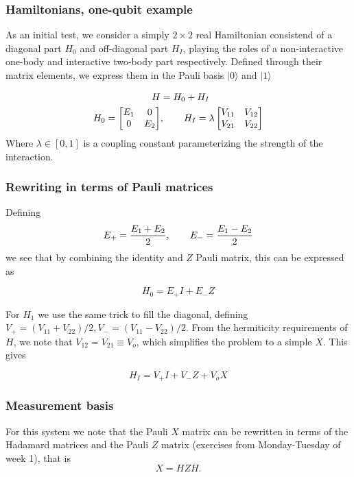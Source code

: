 \documentclass{beamer}
\begin{document}
\begin{frame}
\frametitle{Hamiltonians, one-qubit example}

As an initial test, we consider a simply $2\times 2$ real
Hamiltonian consistend of a diagonal part $H_0$ and off-diagonal part
$H_I$, playing the roles of a non-interactive one-body and interactive
two-body part respectively. Defined through their matrix elements, we
express them in the Pauli basis $\vert 0\rangle$ and $\vert 1 \rangle$

\begin{align*}
    \begin{split} 
        H &= H_0 + H_I \\
        H_0 = \begin{bmatrix}
            E_1 & 0 \\
            0 & E_2
        \end{bmatrix}&, \hspace{20px}
        H_I = \lambda \begin{bmatrix}
            V_{11} & V_{12} \\
            V_{21} & V_{22}
        \end{bmatrix}
    \end{split}
\end{align*}
Where $\lambda \in [0,1]$ is a coupling constant parameterizing the strength of the interaction.
\end{frame}

\begin{frame}
\frametitle{Rewriting in terms of Pauli matrices}

Defining
\[
    E_+ = \frac{E_1 + E_2}{2},\hspace{20px} E_- = \frac{E_1 - E_2}{2}
\]
we see that by combining the identity and $Z$ Pauli matrix, this can be expressed as

\[
    H_0 = E_+ I + E_- Z
\]

For $H_1$ we use the same trick to fill the diagonal, defining $V_+ = (V_{11} + V_{22})/2, V_- = (V_{11} - V_{22})/2$. From the hermiticity requirements of $H$, we note that $V_{12} = V_{21} \equiv V_o$, which simplifies the problem to a simple $X$. This gives

\[
    H_I = V_+ I + V_- Z + V_o X
\]
\end{frame}

\begin{frame}
\frametitle{Measurement basis}

For this system we note that the Pauli $X$ matrix can be rewritten in terms of the Hadamard matrices and the Pauli $Z$ matrix (exercises from Monday-Tuesday of week 1), that is
\[
X=HZH.
\]
\end{frame}
\end{document}
